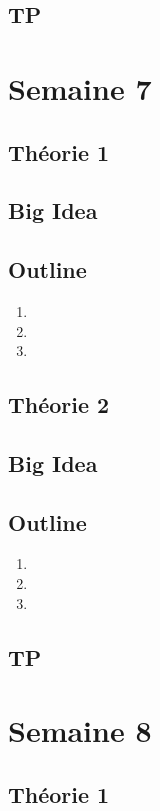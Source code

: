 \documentclass{article}
\begin{document}
\subsection{TP}

\pagebreak
\section{Semaine 7}
\subsection{Théorie 1}
\subsection*{Big Idea}
\subsection*{Outline}
\begin{enumerate}
    \item
    \item
    \item
\end{enumerate}
\subsection{Théorie 2}
\subsection*{Big Idea}
\subsection*{Outline}
\begin{enumerate}
    \item
    \item
    \item
\end{enumerate}
\subsection{TP}

\pagebreak
\section{Semaine 8}
\subsection{Théorie 1}
\end{document}
